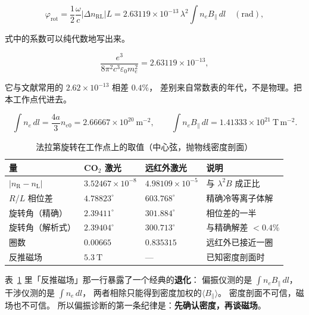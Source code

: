\begin{equation}
\varphi_{\mathrm{rot}}=\frac12\frac{\omega}{c}|\Delta n_{\mathrm{RL}}|L
=2.63119\times10^{-13}\,\lambda^2\!\!\int\! n_e B_\parallel\,dl
\quad(\mathrm{rad}),
\label{eq:app-an-rotation}
\end{equation}

式中的系数可以纯代数地写出来。

\begin{equation}
\frac{e^3}{8\pi^2c^3\varepsilon_0m_e^2}=2.63119\times10^{-13},
\label{eq:app-an-coef}
\end{equation}

它与文献常用的 $2.62\times10^{-13}$ 相差 $0.4\%$，
差别来自常数表的年代，不是物理。把本工作点代进去。

\begin{equation}
\int n_e\,dl=\frac{4a}{3}n_{e0}=2.66667\times10^{20}\ \mathrm{m^{-2}},
\qquad
\int n_eB_\parallel\,dl=1.41333\times10^{21}\ \mathrm{T\,m^{-2}}.
\label{eq:app-an-lineint}
\end{equation}

\begin{table}[htbp]
\centering
\caption{法拉第旋转在工作点上的取值（中心弦，抛物线密度剖面）}
\label{tab:app-an-faraday}
\small
\begin{tabular}{p{3.0cm} p{3.4cm} p{3.4cm} p{4.6cm}}
\toprule
量 & CO$_2$ 激光 & 远红外激光 & 说明 \\
\midrule
$|n_{\mathrm{R}}-n_{\mathrm{L}}|$ & $3.52467\times10^{-8}$ & $4.98109\times10^{-5}$ & 与 $\lambda^2 B$ 成正比 \\
$R$/$L$ 相位差 & $4.78823^\circ$ & $603.768^\circ$ & 精确冷等离子体解 \\
旋转角（精确） & $2.39411^\circ$ & $301.884^\circ$ & 相位差的一半 \\
旋转角（解析式） & $2.39404^\circ$ & $300.713^\circ$ & 与精确解差 $<0.4\%$ \\
圈数 & $0.00665$ & $0.835315$ & 远红外已接近一圈 \\
反推磁场 & $5.3\ \mathrm{T}$ & --- & 已知密度剖面时 \\
\bottomrule
\end{tabular}
\end{table}

表~\ref{tab:app-an-faraday} 里「反推磁场」那一行暴露了一个经典的\textbf{退化}：
偏振仪测的是 $\int n_eB_\parallel\,dl$，干涉仪测的是 $\int n_e\,dl$，
两者相除只能得到密度加权的$\langle B_\parallel\rangle$。
密度剖面不可信，磁场也不可信。
所以偏振诊断的第一条纪律是：\textbf{先确认密度，再谈磁场}。

